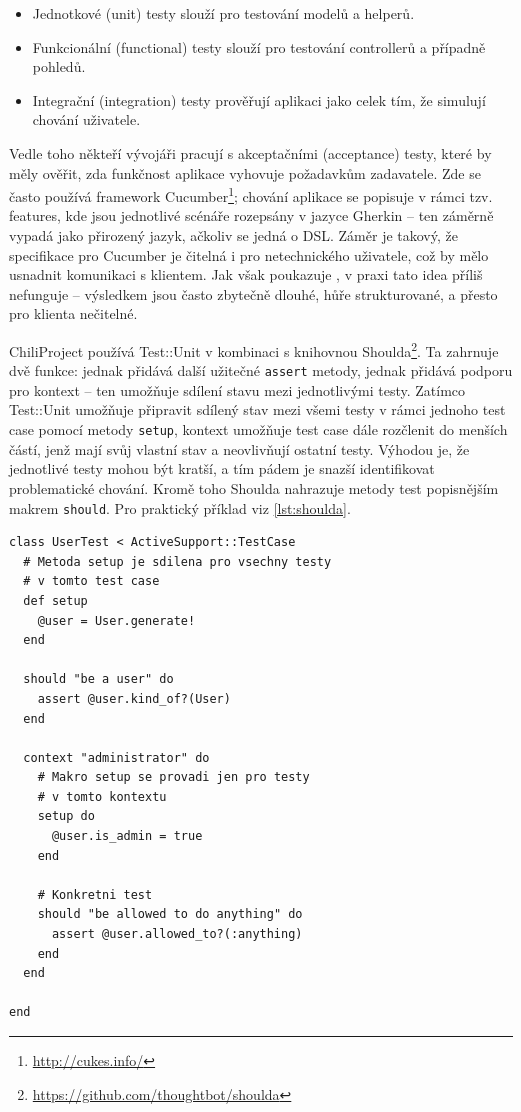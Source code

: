 \documentclass[thesis=B,czech]{FITthesis}[2012/05/02]
\begin{document}
\begin{itemize}
\item
  Jednotkové (unit) testy slouží pro testování modelů a helperů.
\item
  Funkcionální (functional) testy slouží pro testování controllerů a
  případně pohledů.
\item
  Integrační (integration) testy prověřují aplikaci jako celek tím, že
  simulují chování uživatele.
\end{itemize}
Vedle toho někteří vývojáři pracují s akceptačními (acceptance) testy,
které by měly ověřit, zda funkčnost aplikace vyhovuje požadavkům
zadavatele. Zde se často používá framework Cucumber\footnote{\url{http://cukes.info/}};
chování aplikace se popisuje v rámci tzv. features, kde jsou jednotlivé
scénáře rozepsány v jazyce Gherkin -- ten záměrně vypadá jako přirozený
jazyk, ačkoliv se jedná o \gls{DSL}. Záměr je takový, že specifikace pro
Cucumber je čitelná i pro netechnického uživatele, což by mělo usnadnit
komunikaci s klientem. Jak však poukazuje \citep{Kinsella2011}, v praxi
tato idea příliš nefunguje -- výsledkem jsou často  zbytečně dlouhé, hůře strukturované, a přesto pro
klienta nečitelné.

ChiliProject používá Test::Unit v kombinaci s knihovnou
Shoulda\footnote{\url{https://github.com/thoughtbot/shoulda}}. Ta
zahrnuje dvě funkce: jednak přidává další užitečné \lstinline!assert!
metody, jednak přidává podporu pro kontext -- ten umožňuje sdílení stavu
mezi jednotlivými testy. Zatímco Test::Unit umožňuje připravit sdílený
stav mezi všemi testy v rámci jednoho test case pomocí metody
\lstinline!setup!, kontext umožňuje test case dále rozčlenit do menších
částí, jenž mají svůj vlastní stav a neovlivňují ostatní testy. Výhodou je,
že jednotlivé testy mohou být kratší, a tím pádem je snazší
identifikovat problematické chování. Kromě toho Shoulda nahrazuje metody
test popisnějším makrem \lstinline!should!. Pro praktický příklad viz \autoref{lst:shoulda}.

\begin{lstlisting}[float,caption={Test case s frameworky Test::Unit a Shoulda},label=lst:shoulda]
class UserTest < ActiveSupport::TestCase
  # Metoda setup je sdilena pro vsechny testy
  # v tomto test case
  def setup
    @user = User.generate!
  end

  should "be a user" do
    assert @user.kind_of?(User)
  end

  context "administrator" do
    # Makro setup se provadi jen pro testy
    # v tomto kontextu
    setup do
      @user.is_admin = true
    end

    # Konkretni test
    should "be allowed to do anything" do
      assert @user.allowed_to?(:anything)
    end
  end

end
\end{lstlisting}
\end{document}
